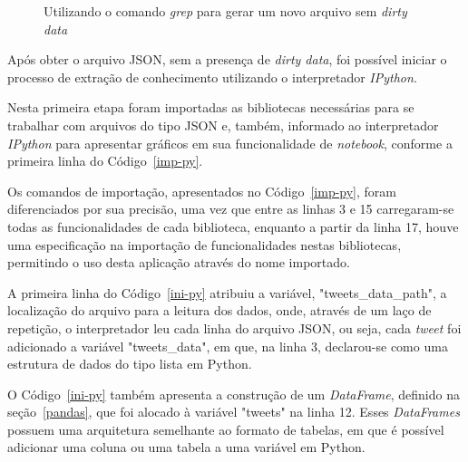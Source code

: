 \begin{figure}[h]
	\centering
	\vspace{0.1cm}
	\caption{Utilizando o comando \textit{grep} para gerar um novo arquivo sem \textit{dirty data}}
	\label{limpa-dado}
\end{figure}

Após obter o arquivo JSON, sem a presença de \textit{dirty data}, foi possível iniciar o processo de extração de conhecimento utilizando o interpretador \textit{IPython}.

Nesta primeira etapa foram importadas as bibliotecas necessárias para se trabalhar com arquivos do tipo JSON e, também, informado ao interpretador \textit{IPython} para apresentar gráficos em sua funcionalidade de \textit{notebook}, conforme a primeira linha do Código~\ref{imp-py}.

Os comandos de importação, apresentados no Código~\ref{imp-py}, foram diferenciados por sua precisão, uma vez que entre as linhas 3 e 15 carregaram-se todas as funcionalidades de cada biblioteca, enquanto a partir da linha 17, houve uma especificação na importação de funcionalidades nestas bibliotecas, permitindo o uso desta aplicação através do nome importado.




A primeira linha do Código~\ref{ini-py} atribuiu a variável, "tweets\_data\_path", a localização do arquivo para a leitura dos dados, onde, através de um laço de repetição, o interpretador leu cada linha do arquivo JSON, ou seja, cada \textit{tweet} foi adicionado a variável "tweets\_data", em que, na linha 3, declarou-se como uma estrutura de dados do tipo lista em Python.



O Código~\ref{ini-py} também apresenta a construção de um \textit{DataFrame}, definido na seção~\ref{pandas}, que foi alocado à variável "tweets" \space na linha 12. Esses \textit{DataFrames} possuem uma arquitetura semelhante ao formato de tabelas, em que é possível adicionar uma coluna ou uma tabela a uma variável em Python.

